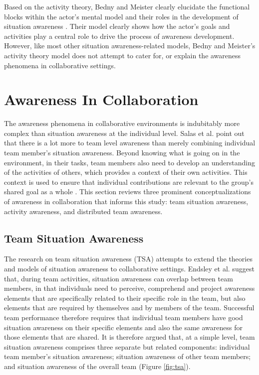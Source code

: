 Based on the activity theory, Bedny and Meister clearly elucidate the functional blocks within the actor's mental model and their roles in the development of situation awareness \cite{Bedny1999}. Their model clearly shows how the actor's goals and activities play a central role to drive the process of awareness development. However, like most other situation awareness-related models, Bedny and Meister's activity theory model does not attempt to cater for, or explain the awareness phenomena in collaborative settings.

\section{Awareness In Collaboration} %
\label{sec:awareness_in_collaboration}
The awareness phenomena in collaborative environments is indubitably more complex than situation awareness at the individual level. Salas et al. \cite{salas1995situation} point out that there is a lot more to team level awareness than merely combining individual team member's situation awareness. Beyond knowing what is going on in the environment, in their tasks, team members also need to develop an understanding of the activities of others, which provides a context of their own activities. This context is used to ensure that individual contributions are relevant to the group's shared goal as a whole \cite{dourish1992awareness}. This section reviews three prominent conceptualizations of awareness in collaboration that informs this study: team situation awareness, activity awareness, and distributed team awareness.

\subsection{Team Situation Awareness} %
\label{sub:team_situation_awareness}
The research on team situation awareness (TSA) attempts to extend the theories and models of situation awareness to collaborative settings. Endsley et al. \cite{endsley2001model} suggest that, during team activities, situation awareness can overlap between team members, in that individuals need to perceive, comprehend and project awareness elements that are specifically related to their specific role in the team, but also elements that are required by themselves and by members of the team. Successful team performance therefore requires that individual team members have good situation awareness on their specific elements and also the same awareness for those elements that are shared. It is therefore argued that, at a simple level, team situation awareness comprises three separate but related components: individual team member's situation awareness; situation awareness of other team members; and situation awareness of the overall team (Figure \ref{fig:tsa}). 

